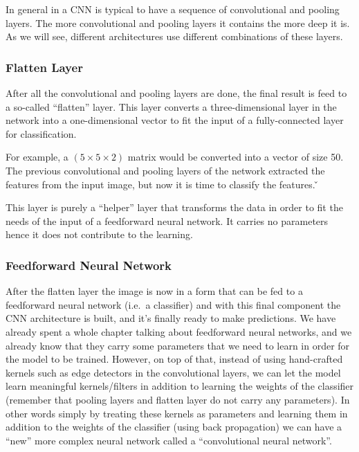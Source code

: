 In general in a CNN is typical to have a sequence of convolutional and pooling layers. The more convolutional and
pooling layers it contains the more deep it is. As we will see, different architectures use different combinations of
these layers.

\subsubsection*{Flatten Layer}

After all the convolutional and pooling layers are done, the final result is feed to a so-called ``flatten'' layer.
This layer converts a three-dimensional layer in the network into a one-dimensional vector to fit the input of a
fully-connected layer for classification.

\be
For example, a $(5 \times 5 \times 2)$ matrix would be converted into a vector of size 50. The previous convolutional
and pooling layers of the network extracted the features from the input image, but now it is time to classify the
features. \v

\ee

This layer is purely a ``helper'' layer that transforms the data in order to fit the needs of the input of a
feedforward neural network. It carries no parameters hence it does not contribute to the learning.

\subsubsection*{Feedforward Neural Network}

After the flatten layer the image is now in a form that can be fed to a feedforward neural network (i.e.\ a classifier)
and with this final component the CNN architecture is built, and it's finally ready to make predictions. We have
already spent a whole chapter talking about feedforward neural networks, and we already know that they carry some
parameters that we need to learn in order for the model to be trained. However, on top of that, instead of using
hand-crafted kernels such as edge detectors in the convolutional layers, we can let the model learn meaningful
kernels/filters in addition to learning the weights of the classifier (remember that pooling layers and flatten layer
do not carry any parameters). In other words simply by treating these kernels as parameters and learning them in
addition to the weights of the classifier (using back propagation) we can have a ``new'' more complex neural network
called a ``convolutional neural network''.

